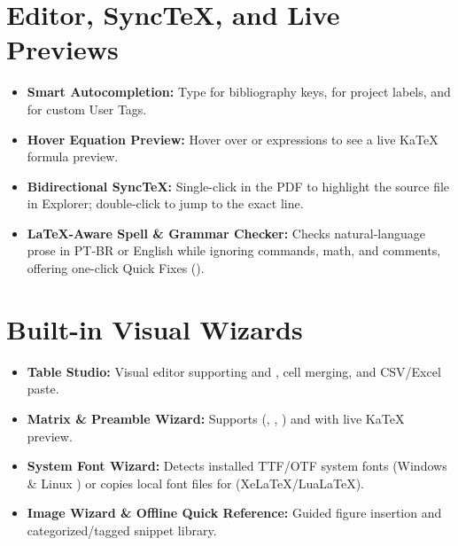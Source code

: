 \documentclass[11pt,a4paper]{article}
\begin{document}
\section{Editor, SyncTeX, and Live Previews}
\begin{itemize}
  \item \textbf{Smart Autocompletion:} Type  for bibliography keys,  for project labels, and \code{:} for custom User Tags.
  \item \textbf{Hover Equation Preview:} Hover over  or  expressions to see a live KaTeX formula preview.
  \item \textbf{Bidirectional SyncTeX:} Single-click in the PDF to highlight the source file in Explorer; double-click to jump to the exact line.
  \item \textbf{LaTeX-Aware Spell \& Grammar Checker:} Checks natural-language prose in PT-BR or English while ignoring commands, math, and comments, offering one-click Quick Fixes ().
\end{itemize}

\section{Built-in Visual Wizards}
\begin{itemize}
  \item \textbf{Table Studio:} Visual editor supporting  and , cell merging, and CSV/Excel paste.
  \item \textbf{Matrix \& Preamble Wizard:} Supports  (, , ) and  with live KaTeX preview.
  \item \textbf{System Font Wizard:} Detects installed TTF/OTF system fonts (Windows \& Linux ) or copies local font files for  (XeLaTeX/LuaLaTeX).
  \item \textbf{Image Wizard \& Offline Quick Reference:} Guided figure insertion and categorized/tagged snippet library.
\end{itemize}
\end{document}
